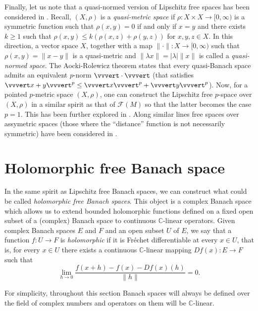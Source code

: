 \documentclass[12pt,leqno]{amsart}
\numberwithin{equation}{section} %
\theoremstyle{definition}
\numberwithin{equation}{section}
\begin{document}
Finally, let us note that a quasi-normed version of Lipschitz free spaces has been considered in \cite{AK}. Recall, $(X,\rho)$ is a \textit{quasi-metric space} if $\rho:X\times X\rightarrow [0,\infty)$ is a symmetric function such that $\rho(x,y)=0$ if and only if $x=y$ and there exists $k\geq1$ such that $\rho(x,y)\leq k(\rho(x,z)+\rho(y,z))$ for $x,y,z\in X$. In this direction, a vector space $X$, together with a map $\|\cdot\|:X\rightarrow [0,\infty)$ such that $\rho(x,y)=\|x-y\|$ is a quasi-metric and $\|\lambda x\|=|\lambda|\|x\|$ is called a \textit{quasi-normed space}. The Aocki-Rolewicz theorem states that every quasi-Banach space admits an equivalent $p$-norm $\vvvert\cdot\vvvert$ (that satisfies $\vvvert x+y\vvvert^p\leq \vvvert x\vvvert^p+\vvvert y\vvvert^p$). Now, for a pointed $p$-metric space $(X,\rho)$, one can construct the Lipschitz free $p$-space over $(X,\rho)$ in a similar spirit as that of $\mathcal F(M)$ so that the latter becomes the case $p=1$. This has been further explored in \cite{AACD, AACD20, AACD21}. Along similar lines free spaces over assymetric spaces (those where the ``distance'' function is not necessarily symmetric) have been considered in \cite{DSV}.\\




\section{Holomorphic free Banach space}\label{sec:holomorfo}

In the same spirit as Lipschitz free Banach spaces, we can construct what could be called \emph{holomorphic free Banach spaces}. This object is a complex Banach space which allows us to extend bounded holomorphic functions defined on a fixed open subset of a (complex) Banach space to continuous $\mathbb{C}$-linear operators.
Given complex Banach spaces $E$ and $F$ and an open subset $U$ of $E$, we say that a function $f:U\to F$ is \textit{holomorphic} if it is Fr\'echet differentiable at every $x\in U$, that is, for every $x\in U$ there exists a continuous $\mathbb{C}$-linear mapping $Df(x):E\to F$ such that 
\begin{equation}\label{eq:frechet-derivative}
 \lim_{h\to 0}\frac{f(x+h)-f(x)-Df(x)(h)}{\|h\|}=0.   
\end{equation}





For simplicity, throughout this section Banach spaces will always be defined over the field of complex numbers and operators on them will be $\mathbb{C}$-linear.
\end{document}
